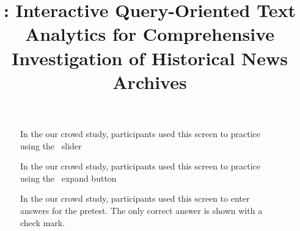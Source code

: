 \documentclass[acmsmall,screen]{acmart}
\title[\ours]{\ours: Interactive Query-Oriented Text Analytics for Comprehensive Investigation of Historical News Archives}
\begin{document}
\begin{figure}[h]
\caption{In the our crowd study, participants used this screen to practice using the \ours~slider}
\end{figure}


\begin{figure}[h]
\caption{In the our crowd study, participants used this screen to practice using the \ours~expand button}
\end{figure}


\begin{figure}[h]
\caption{In the our crowd study, participants used this screen to enter answers for the pretest. The only correct answer is shown with a check mark.}
\end{figure}
\end{document}
